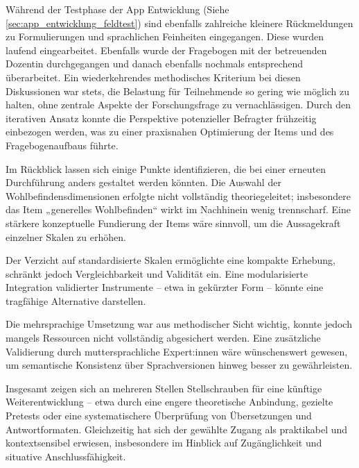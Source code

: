 Während der Testphase der App Entwicklung (Siehe \cref{sec:app_entwicklung_feldtest}) sind ebenfalls zahlreiche kleinere Rückmeldungen zu Formulierungen und sprachlichen Feinheiten eingegangen. Diese wurden laufend eingearbeitet. Ebenfalls wurde der Fragebogen mit der betreuenden Dozentin durchgegangen und danach ebenfalls nochmals entsprechend überarbeitet.
Ein wiederkehrendes methodisches Kriterium bei diesen Diskussionen war stets, die Belastung für Teilnehmende so gering wie möglich zu halten, ohne zentrale Aspekte der Forschungsfrage zu vernachlässigen. Durch den iterativen Ansatz konnte die Perspektive potenzieller Befragter frühzeitig einbezogen werden, was zu einer praxisnahen Optimierung der Items und des Fragebogenaufbaus führte.

Im Rückblick lassen sich einige Punkte identifizieren, die bei einer erneuten Durchführung anders gestaltet werden könnten. Die Auswahl der Wohlbefindensdimensionen erfolgte nicht vollständig theoriegeleitet; insbesondere das Item „generelles Wohlbefinden“ wirkt im Nachhinein wenig trennscharf. Eine stärkere konzeptuelle Fundierung der Items wäre sinnvoll, um die Aussagekraft einzelner Skalen zu erhöhen.

Der Verzicht auf standardisierte Skalen ermöglichte eine kompakte Erhebung, schränkt jedoch Vergleichbarkeit und Validität ein. Eine modularisierte Integration validierter Instrumente – etwa in gekürzter Form – könnte eine tragfähige Alternative darstellen.

Die mehrsprachige Umsetzung war aus methodischer Sicht wichtig, konnte jedoch mangels Ressourcen nicht vollständig abgesichert werden. Eine zusätzliche Validierung durch muttersprachliche Expert:innen wäre wünschenswert gewesen, um semantische Konsistenz über Sprachversionen hinweg besser zu gewährleisten.

Insgesamt zeigen sich an mehreren Stellen Stellschrauben für eine künftige Weiterentwicklung – etwa durch eine engere theoretische Anbindung, gezielte Pretests oder eine systematischere Überprüfung von Übersetzungen und Antwortformaten. Gleichzeitig hat sich der gewählte Zugang als praktikabel und kontextsensibel erwiesen, insbesondere im Hinblick auf Zugänglichkeit und situative Anschlussfähigkeit.





